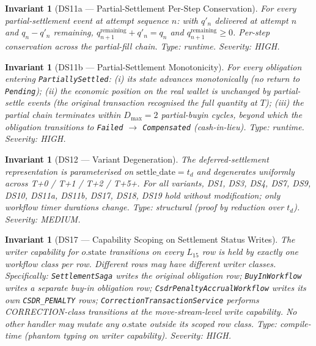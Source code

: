 \documentclass[11pt,a4paper]{article}
\newtheorem{invariant}[definition]{Invariant}
\begin{document}
\begin{invariant}[DS11a --- Partial-Settlement Per-Step Conservation]
\label{inv:DS11a}
For every partial-settlement event at attempt sequence $n$: with $q'_n$ delivered at attempt $n$ and $q_n - q'_n$ remaining, $q_{n+1}^{\mathrm{remaining}} + q'_n = q_n$ and $q_{n+1}^{\mathrm{remaining}} \geq 0$. Per-step conservation across the partial-fill chain.
\textit{Type:} runtime. \textit{Severity:} HIGH.
\end{invariant}

\begin{invariant}[DS11b --- Partial-Settlement Monotonicity]
\label{inv:DS11b}
For every obligation entering \texttt{PartiallySettled}: (i) its state advances monotonically (no return to \texttt{Pending}); (ii) the economic position on the real wallet is unchanged by partial-settle events (the original transaction recognised the full quantity at $T$); (iii) the partial chain terminates within $D_{\max} = 2$ partial-buyin cycles, beyond which the obligation transitions to \texttt{Failed} $\to$ \texttt{Compensated} (cash-in-lieu).
\textit{Type:} runtime. \textit{Severity:} HIGH.
\end{invariant}

\begin{invariant}[DS12 --- Variant Degeneration]
\label{inv:DS12}
The deferred-settlement representation is parameterised on $\mathrm{settle\_date} = t_d$ and degenerates uniformly across T+0 / T+1 / T+2 / T+5+. For all variants, DS1, DS3, DS4, DS7, DS9, DS10, DS11a, DS11b, DS17, DS18, DS19 hold without modification; only workflow timer durations change.
\textit{Type:} structural (proof by reduction over $t_d$). \textit{Severity:} MEDIUM.
\end{invariant}

\begin{invariant}[DS17 --- Capability Scoping on Settlement Status Writes]
\label{inv:DS17}
The writer capability for $o.\mathrm{state}$ transitions on every $L_{15}$ row is held by exactly one workflow class per row. Different rows may have different writer classes. Specifically: \texttt{SettlementSaga} writes the original obligation row; \texttt{BuyInWorkflow} writes a separate buy-in obligation row; \texttt{CsdrPenaltyAccrualWorkflow} writes its own \texttt{CSDR\_PENALTY} rows; \texttt{CorrectionTransactionService} performs CORRECTION-class transitions at the move-stream-level write capability. No other handler may mutate any $o.\mathrm{state}$ outside its scoped row class.
\textit{Type:} compile-time (phantom typing on writer capability). \textit{Severity:} HIGH.
\end{invariant}
\end{document}
